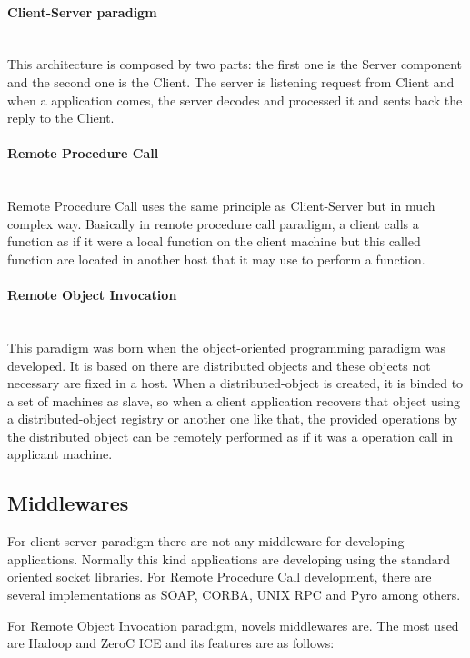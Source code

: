 \paragraph{Client-Server paradigm}~\\
This architecture is composed by two parts: the first one is the Server
component and the second one is the Client. The server is listening request from
Client and when a application comes, the server decodes and processed it and
sents back the reply to the Client.

\paragraph{Remote Procedure Call}~\\
Remote Procedure Call uses the same principle as Client-Server but in much
complex way. Basically in remote procedure call paradigm, a client calls a
function as if it were a local function on the client machine but this called
function are located in another host that it may use to perform a function.

\paragraph{Remote Object Invocation}~\\
This paradigm was born when the object-oriented programming paradigm was
developed. It is based on there are distributed objects and these objects not
necessary are fixed in a host. When a distributed-object is created, it is
binded to a set of machines as slave, so when a client application recovers that
object using a distributed-object registry or another one like that, the
provided operations by the distributed object can be remotely performed as if
it was a  operation call in applicant machine.

\subsection{Middlewares}

For client-server paradigm there are not any middleware for developing
applications. Normally this kind applications are developing using the standard
oriented socket libraries.
For Remote Procedure Call development, there are several implementations as
SOAP, CORBA, UNIX RPC and Pyro among others.

For Remote Object Invocation paradigm, novels middlewares are. The most used are
Hadoop and ZeroC ICE and its features are as follows:

